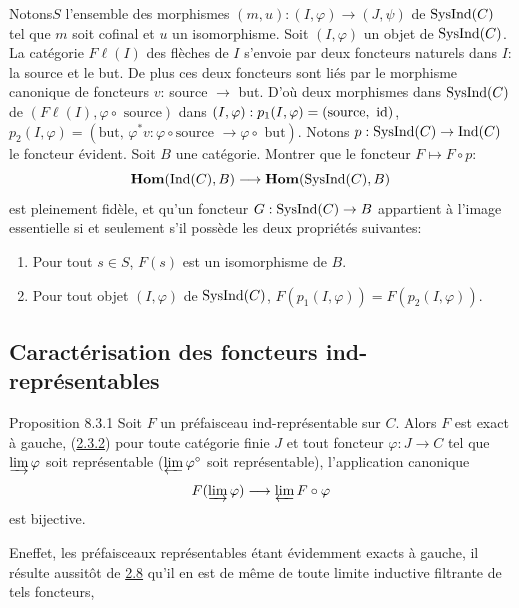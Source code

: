 \documentclass[10pt]{../fichiers-configuration-latex/smfart}
\def\labelenumi{(\theenumi)}
\begin{document}
Notons\pageoriginale $S$ l'ensemble des morphismes
$(m,u):(I,\varphi)\rightarrow (J,\psi)$ de $\operatorname{SysInd}(C)$ tel que $m$
soit cofinal et $u$ un isomorphisme. Soit $(I,\varphi)$ un objet de
$\operatorname{SysInd}(C)$. La catégorie $F\ell(I)$ des flèches de $I$ s'envoie
par deux foncteurs naturels dans $I$: la source et le but. De plus
ces deux foncteurs sont liés par le morphisme canonique de foncteurs
$v$: source $\rightarrow$ but. D'où deux morphismes dans
$\operatorname{SysInd}(C)$ de $(F\ell(I),\varphi\circ\text{ source})$ dans
$(I,\varphi):p_1(I,\varphi)=(\text{source, } \operatorname{id})$,
$p_2(I,\varphi)=(\mbox{but, } \varphi^\ast v:\varphi\circ
\text{source }\rightarrow \varphi\circ{\text{ but}})$. Notons
$p:\operatorname{SysInd}(C)\rightarrow\operatorname{Ind}(C)$ le foncteur évident. Soit $B$ une
catégorie. Montrer que le foncteur $F\mapsto F\circ p$:
$$
\operatorname{\mathbf{Hom}}(\operatorname{Ind}(C),B)\longrightarrow \operatorname{\mathbf{Hom}}(\operatorname{SysInd}(C),B)
$$
est pleinement fidèle, et qu'un foncteur $G:\operatorname{SysInd}(C)\rightarrow B$
appartient à l'image essentielle si et seulement s'il possède les
deux propriétés suivantes:
\begin{enumerate}
\renewcommand{\labelenumi}{\theenumi)}
\item Pour tout $s\in S$, $F(s)$ est un isomorphisme de $B$.

\item Pour tout objet $(I,\varphi)$ de $\operatorname{SysInd}(C)$, $F(p_1(I,\varphi))=F(p_2(I,\varphi))$.
\end{enumerate}

\subsection{Caractérisation des foncteurs ind-représentables}

\begin{enonce*}{Proposition 8.3.1}
Soit $F$ un préfaisceau ind-représentable sur $C$. Alors $F$ est
exact à gauche, \ie (\hyperref[I.cor2.3.2]{2.3.2}) pour toute catégorie finie
$J$ et tout
foncteur $\varphi:J\rightarrow C$ tel que $\varinjlim \varphi$ soit
représentable (\ie $\varprojlim \varphi^\circ$ soit représentable),
l'application canonique
$$
F(\varinjlim \varphi)\longrightarrow \varprojlim F\circ\varphi
$$
est bijective.
\end{enonce*}

En\pageoriginale effet, les préfaisceaux représentables étant
évidemment exacts à gauche, il résulte aussitôt
de \hyperref[I.prop2.8]{2.8} qu'il en est
de même de toute limite inductive filtrante de tels foncteurs, \cqfd
\end{document}
